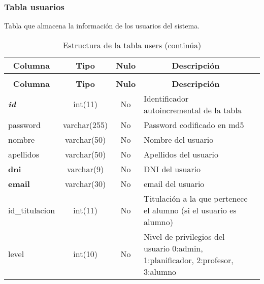 \subsubsection{Tabla usuarios}
Tabla que almacena la información de los usuarios del sistema.
%
%
 \begin{longtable}{|l|c|c|l|l|} 
 \caption{Estructura de la tabla users} \label{tab:users-structure} \\
 \hline \multicolumn{1}{|c|}{\textbf{Columna}} & \multicolumn{1}{|c|}{\textbf{Tipo}} & \multicolumn{1}{|c|}{\textbf{Nulo}} & \multicolumn{1}{|c|}{\textbf{Descripción}} \\ \hline \hline
\endfirsthead
 \caption{Estructura de la tabla users (continúa)} \\ 
 \hline \multicolumn{1}{|c|}{\textbf{Columna}} & \multicolumn{1}{|c|}{\textbf{Tipo}} & \multicolumn{1}{|c|}{\textbf{Nulo}} & \multicolumn{1}{|c|}{\textbf{Descripción}}  \\ \hline \hline \endhead \endfoot 
\textbf{\textit{id}} & int(11) & No & Identificador autoincremental de la tabla \\ \hline 
password & varchar(255) & No & Password codificado en md5 \\ \hline 
nombre & varchar(50) & No & Nombre del usuario \\ \hline 
apellidos & varchar(50) & No & Apellidos del usuario \\ \hline 
\textbf{dni} & varchar(9) & No & DNI del usuario \\ \hline 
\textbf{email} & varchar(30) & No & email del usuario \\ \hline 
id\_titulacion & int(11) & No & Titulación a la que pertenece el alumno (si el usuario es alumno) \\ \hline 
level & int(10)  & No & Nivel de privilegios del usuario 0:admin, 1:planificador, 2:profesor, 3:alumno \\ \hline 
 \end{longtable}


